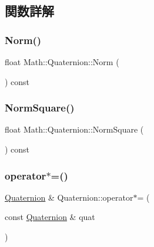 \subsection{関数詳解}
\mbox{\label{struct_math_1_1_quaternion_a1cd5a9d8be7f9b85c4eb7ba661238a09}} 
\subsubsection{\texorpdfstring{Norm()}{Norm()}}
{\footnotesize\ttfamily float Math\+::\+Quaternion\+::\+Norm (\begin{DoxyParamCaption}{ }\end{DoxyParamCaption}) const}

\mbox{\label{struct_math_1_1_quaternion_a8f147b15819df35d4448c9765adc4eb8}} 
\subsubsection{\texorpdfstring{Norm\+Square()}{NormSquare()}}
{\footnotesize\ttfamily float Math\+::\+Quaternion\+::\+Norm\+Square (\begin{DoxyParamCaption}{ }\end{DoxyParamCaption}) const}

\mbox{\label{struct_math_1_1_quaternion_ab259c5d0a79c9fcb816b2167f8dc32dd}} 
\subsubsection{\texorpdfstring{operator$\ast$=()}{operator*=()}\hspace{0.1cm}{\footnotesize\ttfamily [1/2]}}
{\footnotesize\ttfamily \mbox{\hyperlink{struct_math_1_1_quaternion}{Quaternion}} \& Quaternion\+::operator$\ast$= (\begin{DoxyParamCaption}\item[{const \mbox{\hyperlink{struct_math_1_1_quaternion}{Quaternion}} \&}]{quat }\end{DoxyParamCaption})}


